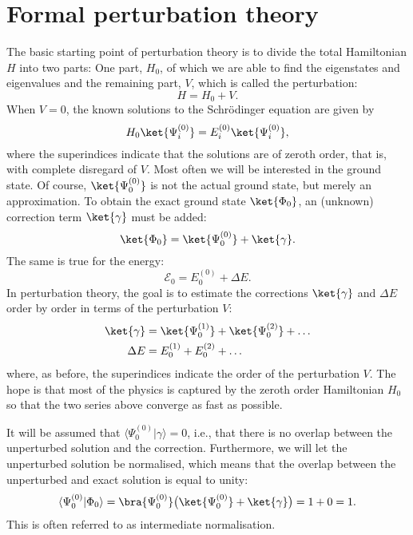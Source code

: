 \section{Formal perturbation theory}
The basic starting point of perturbation theory is to divide the total Hamiltonian $H$ into two parts: One part, $H_0$, of which we are able to find the eigenstates and eigenvalues and
the remaining part, $V$, which is called the perturbation:
\begin{equation}
 H = H_0 + V.
\end{equation}
When $V=0$, the known solutions to the Schrödinger equation are given by
\begin{equation}
 H_0\ket{\Psi^{(0)}_i} = E^{(0)}_i\ket{\Psi^{(0)}_i},
\end{equation}
where the superindices indicate that the solutions are of zeroth order, that is, with complete disregard of $V$. Most often we will be interested in the ground state. Of course, $\ket{\Psi^{(0)}_0}$ is not the actual
ground state, but merely an approximation. To obtain the exact ground state $\ket{\Phi_0}$, an (unknown) correction term $\ket{\gamma}$ must be added:
\begin{equation}
 \ket{\Phi_0} = \ket{\Psi^{(0)}_0} + \ket{\gamma}.
\end{equation}
The same is true for the energy:
\begin{equation}
\label{eq:def_deltaE}
 \mathscr E_0 = E^{(0)}_0 + \Delta E.
\end{equation}
In perturbation theory, the goal is to estimate the corrections $\ket{\gamma}$ and $\Delta E$ order by order in terms of the perturbation $V$:
\begin{align}
 \ket{\gamma} & = \ket{\Psi^{(1)}_0} + \ket{\Psi^{(2)}_0} + \dots \\
 \Delta E  & = E^{(1)}_0 + E^{(2)}_0 + \dots
\end{align}
where, as before, the superindices indicate the order of the perturbation $V$.
The hope is that most of the physics is captured by the zeroth order Hamiltonian $H_0$ so that the two series above converge as fast as possible.

It will be assumed that $\langle\Psi^{(0)}_0|\gamma\rangle = 0$, i.e., that there is no overlap between the unperturbed solution and the correction. Furthermore, we will let the unperturbed
solution be normalised, which means that the overlap between the unperturbed and exact solution is equal to unity:
\begin{equation}
\label{eq:intermediate_normalisation}
 \langle\Psi^{(0)}_0|\Phi_0\rangle = \bra{\Psi^{(0)}_0}\big(\ket{\Psi^{(0)}_0} + \ket{\gamma}\big) = 1 + 0 = 1.
\end{equation}
This is often referred to as intermediate normalisation.

